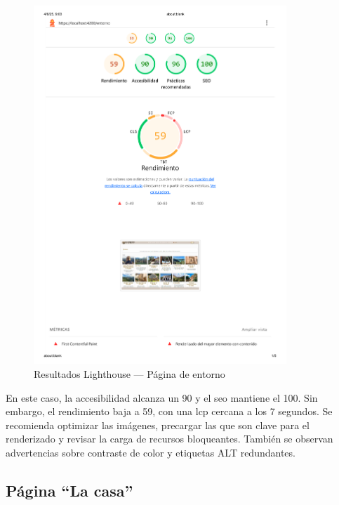 \begin{figure}[h!tb]
  \centering
  \includegraphics[width=0.85\textwidth]{figs/entorno_lighthouse.png}
  \caption{Resultados Lighthouse — Página de entorno}
  \label{fig:lighthouse-entorno}
\end{figure}

En este caso, la accesibilidad alcanza un 90 y el \gls{seo} mantiene el 100. Sin embargo, el rendimiento baja a 59, con una \gls{lcp} cercana a los 7 segundos. Se recomienda optimizar las imágenes, precargar las que son clave para el renderizado y revisar la carga de recursos bloqueantes. También se observan advertencias sobre contraste de color y etiquetas ALT redundantes.

\subsection*{Página “La casa”}

